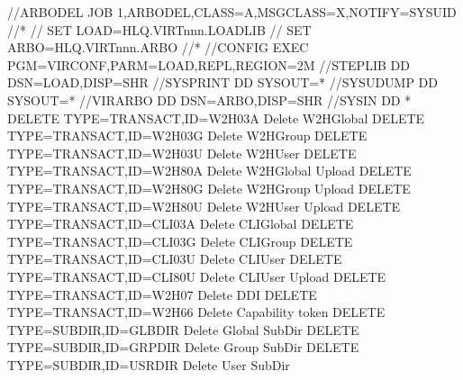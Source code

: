 \documentclass[letterpaper,10pt,english]{sphinxmanual}
\begin{document}
\begin{sphinxVerbatim}[commandchars=\\\{\}]
//\PYGZdl{}ARBODEL JOB 1,ARBODEL,CLASS=A,MSGCLASS=X,NOTIFY=\PYGZam{}SYSUID
//*
// SET LOAD=HLQ.VIRTnnn.LOADLIB
// SET ARBO=HLQ.VIRTnnn.ARBO
//*
//CONFIG  EXEC PGM=VIRCONF,PARM=\PYGZsq{}LOAD,REPL\PYGZsq{},REGION=2M
//STEPLIB  DD  DSN=\PYGZam{}LOAD,DISP=SHR
//SYSPRINT DD  SYSOUT=*
//SYSUDUMP DD  SYSOUT=*
//VIRARBO  DD  DSN=\PYGZam{}ARBO,DISP=SHR
//SYSIN      DD *
 DELETE TYPE=TRANSACT,ID=W2H\PYGZhy{}03A    Delete W2H\PYGZhy{}Global
 DELETE TYPE=TRANSACT,ID=W2H\PYGZhy{}03G    Delete W2H\PYGZhy{}Group
 DELETE TYPE=TRANSACT,ID=W2H\PYGZhy{}03U    Delete W2H\PYGZhy{}User
 DELETE TYPE=TRANSACT,ID=W2H\PYGZhy{}80A    Delete W2H\PYGZhy{}Global Upload
 DELETE TYPE=TRANSACT,ID=W2H\PYGZhy{}80G    Delete W2H\PYGZhy{}Group Upload
 DELETE TYPE=TRANSACT,ID=W2H\PYGZhy{}80U    Delete W2H\PYGZhy{}User Upload
 DELETE TYPE=TRANSACT,ID=CLI\PYGZhy{}03A    Delete CLI\PYGZhy{}Global
 DELETE TYPE=TRANSACT,ID=CLI\PYGZhy{}03G    Delete CLI\PYGZhy{}Group
 DELETE TYPE=TRANSACT,ID=CLI\PYGZhy{}03U    Delete CLI\PYGZhy{}User
 DELETE TYPE=TRANSACT,ID=CLI\PYGZhy{}80U    Delete CLI\PYGZhy{}User Upload
 DELETE TYPE=TRANSACT,ID=W2H\PYGZhy{}07     Delete DDI
 DELETE TYPE=TRANSACT,ID=W2H\PYGZhy{}66     Delete Capability token
 DELETE TYPE=SUBDIR,ID=GLB\PYGZhy{}DIR      Delete Global Sub\PYGZhy{}Dir
 DELETE TYPE=SUBDIR,ID=GRP\PYGZhy{}DIR      Delete Group Sub\PYGZhy{}Dir
 DELETE TYPE=SUBDIR,ID=USR\PYGZhy{}DIR      Delete User Sub\PYGZhy{}Dir
\end{sphinxVerbatim}

\ignorespaces 
\end{document}
